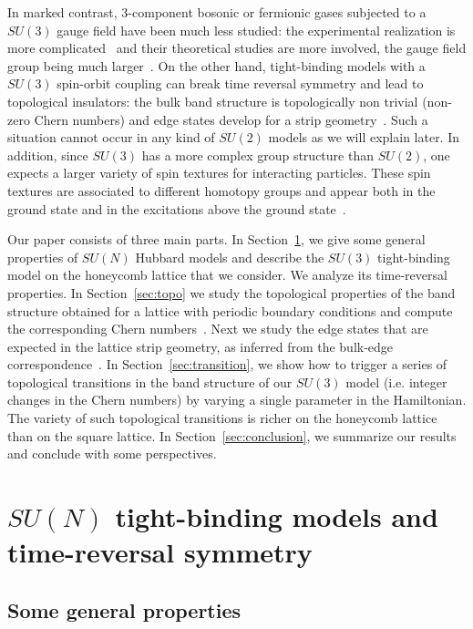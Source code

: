 \documentclass[aps,pra,showpacs,twocolumn,superscriptaddress]{revtex4-1}
\begin{document}
In marked contrast, 3-component bosonic or fermionic gases subjected to a $SU(3)$ gauge field have 
been much less studied: the experimental
realization is more complicated~\cite{Dalibard11,YuXin2014,Kosior2014} and their theoretical studies
are more involved, the gauge field group being much larger~\cite{Barnett2012,Mandal2016,Han2016,Grass2014,Go2013}.
On the other hand, 
tight-binding models with a $SU(3)$ spin-orbit coupling can break time reversal symmetry and lead to topological 
insulators: the bulk band structure is topologically non trivial (non-zero Chern numbers) and edge states 
develop for a strip geometry~\cite{Barnett2012}. Such a situation cannot occur in any kind 
of $SU(2)$ models as we will explain later. In addition, since $SU(3)$ has a more complex group 
structure than $SU(2)$, one expects a larger
variety of spin textures for interacting particles. These spin textures are associated to different 
homotopy groups and appear both in the ground state and in the excitations above the ground 
state~\cite{Hueda12,Ezawa_book,Mandal2016,Han2016,Grass2014,Go2013}. 

Our paper consists of three main parts. In Section~\ref{sec:method}, we give some general 
properties of $SU(N)$ Hubbard models and describe the $SU(3)$ tight-binding model on the 
honeycomb lattice that we consider. We analyze its time-reversal properties. In Section~\ref{sec:topo} 
we study the topological properties of the band structure obtained for a lattice with periodic 
boundary conditions and compute the corresponding Chern numbers~\cite{Resta2000, Paly2016, Niu2010, Houches2014}. 
Next we study the edge states that are expected in the lattice strip geometry, as inferred 
from the bulk-edge correspondence~\cite{Hatsugai1993a, Hatsugai1993b, Hatsugai1997, Kane2005, Kane2010}. 
In Section~\ref{sec:transition}, we show how to trigger a series of topological transitions in the 
band structure of our $SU(3)$ model (i.e. integer changes in the Chern numbers) by varying a single 
parameter in the Hamiltonian. The variety of such topological transitions is richer on the honeycomb 
lattice than on the square lattice. In Section~\ref{sec:conclusion}, we summarize our results and 
conclude with some perspectives.


\section{$SU(N)$ tight-binding models and time-reversal symmetry}
\label{sec:method}

\subsection{Some general properties}
\end{document}

